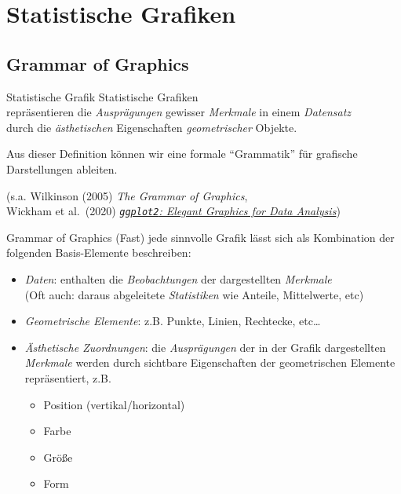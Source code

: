 \documentclass[
  10pt,
  ignorenonframetext,
]{beamer}
\providecommand{\tightlist}{%
  \setlength{\itemsep}{0pt}\setlength{\parskip}{0pt}}
\begin{document}
\section{Statistische Grafiken}\label{statistische-grafiken}

\subsection{Grammar of Graphics}\label{grammar-of-graphics}

\begin{frame}[fragile]{Statistische Grafik}
\label{statistische-grafik}
Statistische Grafiken\\
repräsentieren die \emph{Ausprägungen} gewisser \emph{Merkmale} in einem
\emph{Datensatz}\\
durch die \emph{ästhetischen} Eigenschaften \emph{geometrischer}
Objekte.

Aus dieser Definition können wir eine formale ``Grammatik'' für
grafische Darstellungen ableiten.

\footnotesize

(s.a. Wilkinson (2005) \emph{The Grammar of Graphics},\\
Wickham et al.~(2020)
\href{https://ggplot2-book.org/}{\emph{\texttt{ggplot2}: Elegant
Graphics for Data Analysis}})
\end{frame}

\begin{frame}{Grammar of Graphics}
\label{grammar-of-graphics-1}
(Fast) jede sinnvolle Grafik lässt sich als Kombination der folgenden
Basis-Elemente beschreiben:

\begin{itemize}
\tightlist
\item
  \emph{Daten}: enthalten die \emph{Beobachtungen} der dargestellten
  \emph{Merkmale}\\
  (Oft auch: daraus abgeleitete \emph{Statistiken} wie Anteile,
  Mittelwerte, etc)\\
\item
  \emph{Geometrische Elemente}: z.B. Punkte, Linien, Rechtecke,
  etc\ldots{}
\item
  \emph{Ästhetische Zuordnungen}: die \emph{Ausprägungen} der in der
  Grafik dargestellten \emph{Merkmale} werden durch sichtbare
  Eigenschaften der geometrischen Elemente repräsentiert, z.B.

  \begin{itemize}
  \tightlist
  \item
    Position (vertikal/horizontal)
  \item
    Farbe
  \item
    Größe
  \item
    Form
  \end{itemize}
\end{itemize}
\end{frame}
\end{document}

